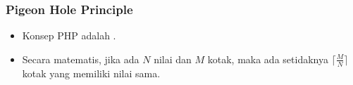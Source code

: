 \begin{frame}
\frametitle{Pigeon Hole Principle}
\begin{itemize}
  \item Konsep PHP adalah .
  \item Secara matematis, jika ada $N$ nilai dan $M$ kotak, maka ada setidaknya $\big\lceil \frac{M}{N} \big\rceil$ kotak yang memiliki nilai sama.
\end{itemize}
\end{frame}


